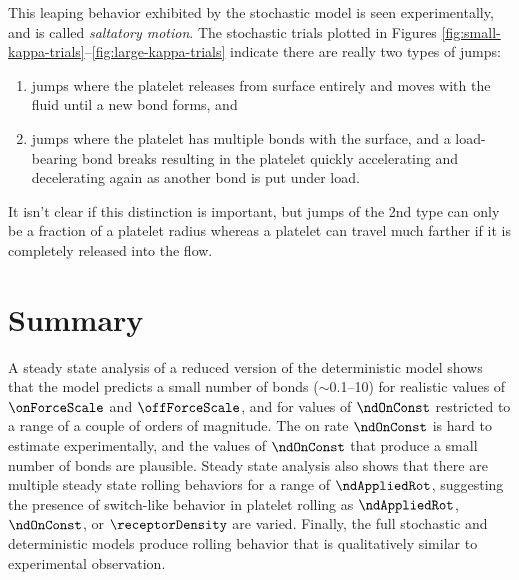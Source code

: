 This leaping behavior exhibited by the stochastic model is
seen experimentally, and is called \emph{saltatory
  motion}. The stochastic trials plotted in Figures
\ref{fig:small-kappa-trials}--\ref{fig:large-kappa-trials} indicate
there are really two types of jumps:
\begin{enumerate}
\item jumps where the platelet releases from surface entirely and
  moves with the fluid until a new bond forms, and
\item jumps where the platelet has multiple bonds with the surface,
  and a load-bearing bond breaks resulting in the platelet quickly
  accelerating and decelerating again as another bond is put under load.
\end{enumerate}
It isn't clear if this distinction is important, but jumps of the 2nd
type can only be a fraction of a platelet radius whereas a platelet
can travel much farther if it is completely released into the flow.

\section{Summary}
\label{sec:summary-results}

A steady state analysis of a reduced version of the deterministic
model shows that the model predicts a small number of bonds
($\sim$0.1--10) for realistic values of $\onForceScale$ and
$\offForceScale$, and for values of $\ndOnConst$ restricted to a range
of a couple of orders of magnitude. The on rate $\ndOnConst$ is hard
to estimate experimentally, and the values of $\ndOnConst$ that
produce a small number of bonds are plausible. Steady state analysis
also shows that there are multiple steady state rolling behaviors for
a range of $\ndAppliedRot$, suggesting the presence of switch-like
behavior in platelet rolling as $\ndAppliedRot$, $\ndOnConst$, or
$\receptorDensity$ are varied. Finally, the full stochastic and
deterministic models produce rolling behavior that is qualitatively
similar to experimental observation.


